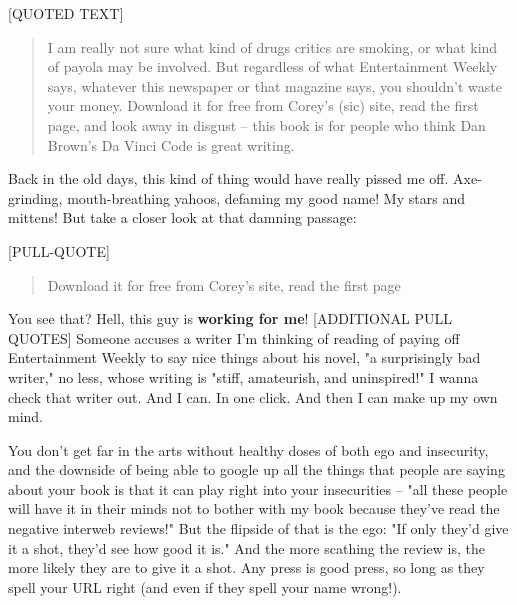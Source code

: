 [QUOTED TEXT]

\begin{quote}
I am really not sure what kind of drugs critics are smoking, or
what kind of payola may be involved. But regardless of what
Entertainment Weekly says, whatever this newspaper or that magazine
says, you shouldn't waste your money. Download it for free from
Corey's (sic) site, read the first page, and look away in disgust
-- this book is for people who think Dan Brown's Da Vinci Code is
great writing.

\end{quote}
Back in the old days, this kind of thing would have really pissed
me off. Axe-grinding, mouth-breathing yahoos, defaming my good
name! My stars and mittens! But take a closer look at that damning
passage:

[PULL-QUOTE]

\begin{quote}
Download it for free from Corey's site, read the first page

\end{quote}
You see that? Hell, this guy is \textbf{working for me}!
[ADDITIONAL PULL QUOTES] Someone accuses a writer I'm thinking of
reading of paying off Entertainment Weekly to say nice things about
his novel, "a surprisingly bad writer," no less, whose writing is
"stiff, amateurish, and uninspired!" I wanna check that writer out.
And I can. In one click. And then I can make up my own mind.

You don't get far in the arts without healthy doses of both ego and
insecurity, and the downside of being able to google up all the
things that people are saying about your book is that it can play
right into your insecurities -- "all these people will have it in
their minds not to bother with my book because they've read the
negative interweb reviews!" But the flipside of that is the ego:
"If only they'd give it a shot, they'd see how good it is." And the
more scathing the review is, the more likely they are to give it a
shot. Any press is good press, so long as they spell your URL right
(and even if they spell your name wrong!).

